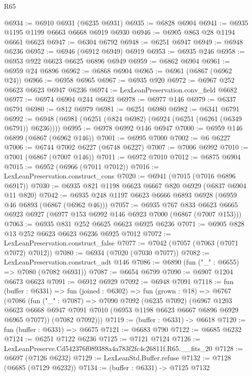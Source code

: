 \begin{lexlean}{R65}
\begin{coremodule}
{@6934 := @6910 @6931 (@6235 @6931)
@6935 := @6828 @6904
@6941 := @6935 @1195 @1199 @6663 @6668 @6919 @6930
@6946 := @6905 @863 @28 @1194 @6661 @6623
@6947 := @6304 @6792
@6948 := @6251 @6947
@6949 := @6948 @6236
@6952 := @6946 (@6912 @6949) @6919
@6953 := @6935 @246
@6958 := @6953 @922 @6623 @6625 @6896 @6949
@6959 := @6862 @6904
@6961 := @6959 @24 @6896
@6962 := @6868 @6904
@6965 := @6961 (@6867 (@6962 @24))
@6966 := @6958 @6965
@6967 := @6935 @920
@6972 := @6967 @252 @6623 @6623 @6947 @6236
@6974 := LexLeanPreservation.conv_field @6682
@6977 := @6974 @6904 @244 @6623
@6978 := @6977 @146
@6979 := @6337 @6791
@6980 := @812 @6979
@6981 := @6251 @6980
@6982 := @6341 @6791
@6992 := @6948 (@6981 (@6251 (@824 @6982) (@6924 (@6251 (@6261 (@6349 @6791)) @6236))))
@6995 := @6978 @6992 @146 @6947
@7000 := @6959 @146 @6899 (@6867 (@6962 @146))
@7001 := @6995 @7000
@7002 := @6 @6227
@7006 := @6744 @7002 @6227 (@6748 @6227)
@7007 := @7006 @6992
@7010 := @7001 (@6867 (@7007 @146))
@7011 := @6972 @7010
@7012 := @6875 @6904
@7015 := @6952 (@6966 (@7011 @7012))
@7016 := LexLeanPreservation.construct_cons
@7020 := @6941 (@7015 (@7016 @6896 @6917))
@7030 := @6935 @821 @1198 @6623 @6667 @820 @6929 (@6837 @6904 @11 @820)
@7042 := @6935 @248 @1197 @6623 @6666 @6893 @6928 (@6959 @46 @6893 (@6867 (@6962 @46)))
@7057 := @6935
    @767
    @833
    @6623
    @6665
    @6923
    @6927
    (@6977 @153 @6992 @146 @6923 @7000 (@6867 (@7007 @153)))
@7063 := @6935 @831 @252 @6625 @6623 @6925 @6236
@7071 := @6905 @828 @13 @252 @6623 @6623 @6236 @6925 @7012
@7072 := LexLeanPreservation.construct_false
@7077 := @7042 (@7057 (@7063 (@7071 @7072) @7012))
@7080 := @6934 (@7020 (@7030 @7077))
@7082 := LexLeanPreservation.construct_adt @146
@7086 := @6890 (fun ("_" : @6655) => @7080 (@7082 @6931))
@7087 := @6654 @6799
@7090 := @6907 @1204 @6673 @6623
@7091 := @6912 @6929
@7092 := @6948 @7091
@7118 := fun (buffer : @6331) =>
  fun (joined : @6302) =>
  fun (grown : @18) =>
  @6767
    (@7086
      (fun ("_" : @7087) =>
      @7090
        @7092
        (@6235 @7092)
        (@6967
          @1203
          @6623
          @6668
          @6947
          @7091
          @7010
          (@6953 @1198 @6623 @6667 @6896 @6929 @6965 @7077))
        (@7082 @7092)))
@7119 := (buffer : @6331) -> @6618
@7120 := fun (buffer : @6331) => @6675
@7121 := @6683 @790
@7122 := @6685 @6232
@7124 := @6251 @7122 @6236
@7125 := @7121 @7124
@7126 := LexLeanPreserve.Cd542376f089388a4a783f2fc4c26811f.R65.__fits_20
@7128 := @6697 (@7126 @6232)
@7129 := LexLeanStd.Buffer.refuse
@7132 := @7128 (@6685 (@7129 @6232))
@7134 := (buffer : @6331) -> @7125 @7132
}
\end{coremodule}
\end{lexlean}
